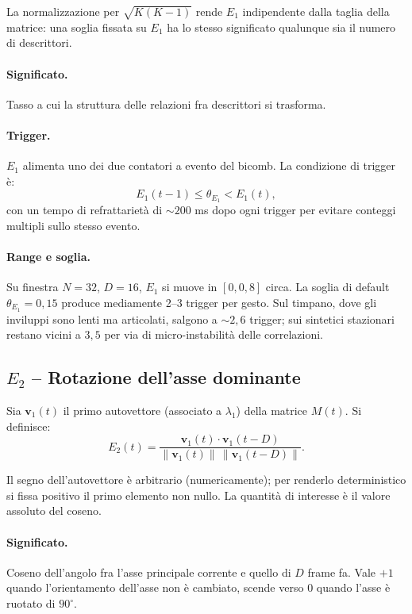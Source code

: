 \documentclass[a4paper,11pt]{article}
\begin{document}
La normalizzazione per $\sqrt{K(K-1)}$ rende $E_1$ indipendente dalla
taglia della matrice: una soglia fissata su $E_1$ ha lo stesso
significato qualunque sia il numero di descrittori.

\paragraph{Significato.}
Tasso a cui la struttura delle relazioni fra descrittori si trasforma.

\paragraph{Trigger.}
$E_1$ alimenta uno dei due contatori a evento del bicomb. La condizione
di trigger è:
\[
E_1(t-1) \le \theta_{E_1} < E_1(t),
\]
con un tempo di refrattarietà di $\sim 200$ ms dopo ogni trigger per
evitare conteggi multipli sullo stesso evento.

\paragraph{Range e soglia.}
Su finestra $N = 32$, $D = 16$, $E_1$ si muove in $[0, 0{,}8]$ circa.
La soglia di default $\theta_{E_1} = 0{,}15$ produce mediamente 2--3
trigger per gesto. Sul timpano, dove gli inviluppi sono lenti ma
articolati, salgono a $\sim 2{,}6$ trigger; sui sintetici stazionari
restano vicini a $3{,}5$ per via di micro-instabilità delle correlazioni.

\subsection{$E_2$ -- Rotazione dell'asse dominante}

\formula
Sia $\mathbf{v}_1(t)$ il primo autovettore (associato a $\lambda_1$)
della matrice $M(t)$. Si definisce:
\[
E_2(t) = \frac{\mathbf{v}_1(t) \cdot \mathbf{v}_1(t - D)}
              {\lVert\mathbf{v}_1(t)\rVert\, \lVert\mathbf{v}_1(t-D)\rVert}.
\]

Il segno dell'autovettore è arbitrario (numericamente); per renderlo
deterministico si fissa positivo il primo elemento non nullo. La
quantità di interesse è il valore assoluto del coseno.

\paragraph{Significato.}
Coseno dell'angolo fra l'asse principale corrente e quello di $D$ frame
fa. Vale $+1$ quando l'orientamento dell'asse non è cambiato, scende
verso $0$ quando l'asse è ruotato di $90^\circ$.
\end{document}
